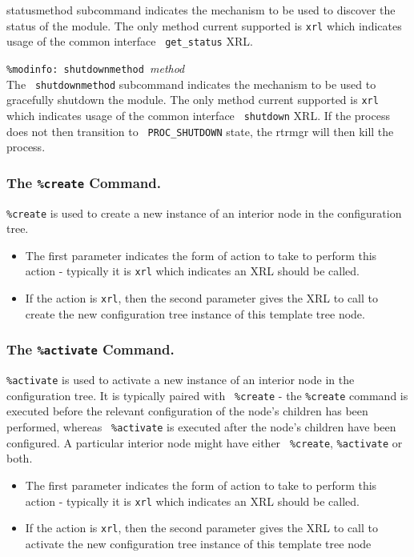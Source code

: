 \documentclass[11pt]{article}
\begin{document}
\begin{description}
{statusmethod} subcommand indicates the mechanism to be used to
discover the status of the module.  The only method current supported
is {\tt xrl} which indicates usage of the common interface {\tt
get\_status} XRL.
\item {{\tt \%modinfo: shutdownmethod }{\it method}}  \\The {\tt
shutdownmethod} subcommand indicates the mechanism to be used to
gracefully shutdown the module.  The only method current supported
is {\tt xrl} which indicates usage of the common interface {\tt
shutdown} XRL.  If the process does not then transition to {\tt
PROC\_SHUTDOWN} state, the rtrmgr will then kill the process.
\end{description}
\subsubsection{The {\tt \%create} Command.}
{\tt \%create} is used to create a new instance of an interior node in
the configuration tree.  
\begin{itemize}
\item The first parameter indicates the form of
action to take to perform this action - typically it is {\tt xrl}
which indicates an XRL should be called.  
\item If the action is {\tt xrl}, then the second parameter gives the XRL to
call to create the new configuration tree instance of this template
tree node.
\end{itemize}

\subsubsection{The {\tt \%activate} Command.}
{\tt \%activate} is used to activate a new instance of an interior
node in the configuration tree.  It is typically paired with {\tt
\%create} - the {\tt \%create} command is executed before the relevant
configuration of the node's children has been performed, whereas {\tt
\%activate} is executed after the node's children have been
configured.  A particular interior node might have either {\tt
\%create}, {\tt \%activate} or both.
\begin{itemize}
\item The first parameter indicates the form of action to take to perform
this action - typically it is {\tt xrl} which indicates an XRL should
be called.
\item If the action is {\tt xrl}, then the second parameter gives the XRL to
call to activate the new configuration tree instance of this template
tree node
\end{itemize}
\end{document}
